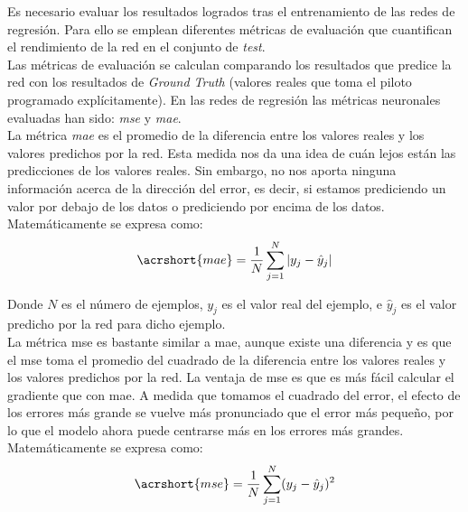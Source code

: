 Es necesario evaluar los resultados logrados tras el entrenamiento de las redes de regresión. Para ello se emplean diferentes métricas de evaluación que cuantifican el rendimiento de la red en el conjunto de \textit{test}.\\

Las métricas de evaluación se calculan comparando los resultados que predice la red con los resultados de \textit{Ground Truth} (valores reales que toma el piloto programado explícitamente). En las redes de regresión las métricas neuronales evaluadas han sido: \textit{\acrfull{mse}} y \textit{\acrfull{mae}}. \\

La métrica \textit{\acrfull{mae}} es el promedio de la diferencia entre los valores reales y los valores predichos por la red. Esta medida nos da una idea de cuán lejos están las predicciones de los valores reales. Sin embargo, no nos aporta ninguna información acerca de la dirección del error, es decir, si estamos prediciendo un valor por debajo de los datos o prediciendo por encima de los datos. Matemáticamente se expresa como:\\

\begin{equation}\label{eq:mae_reg}
    \acrshort{mae} = \frac{1}{N}\sum_{j=1}^{N}|y_j - \hat{y}_j|
\end{equation}
\vspace{10pt}

Donde \(N\) es el número de ejemplos, \(y_j\) es el valor real del ejemplo, e \(\hat{y}_j\) es el valor predicho por la red para dicho ejemplo.\\

La métrica \acrfull{mse} es bastante similar a \acrfull{mae}, aunque existe una diferencia y es que el \acrshort{mse} toma el promedio del cuadrado de la diferencia entre los valores reales y los valores predichos por la red. La ventaja de \acrshort{mse} es que es más fácil calcular el gradiente que con \acrshort{mae}. A medida que tomamos el cuadrado del error, el efecto de los errores más grande se vuelve más pronunciado que el error más pequeño, por lo que el modelo ahora puede centrarse más en los errores más grandes. Matemáticamente se expresa como:\\

\begin{equation}\label{eq:mse_reg}
    \acrshort{mse} = \frac{1}{N}\sum_{j=1}^{N}(y_j - \hat{y}_j)^2
\end{equation}
\vspace{10pt}

